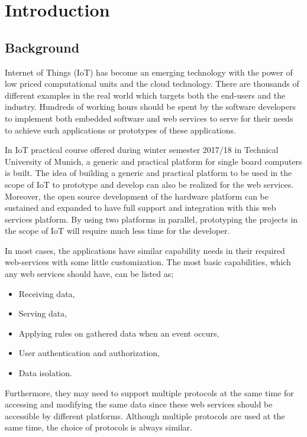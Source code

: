 
\chapter{Introduction}\label{chapter:introduction}

\section{Background}
Internet of Things (IoT) has become an emerging technology with the power of low priced computational units and the cloud technology. There are thousands of different examples in the real world which targets both the end-users and the industry. Hundreds of working hours should be spent by the software developers to implement both embedded software and web services to serve for their needs to achieve such applications or prototypes of these applications. 


In IoT practical course offered during winter semester 2017/18 in Technical University of Munich, a generic and practical platform for single board computers is built. The idea of building a generic and practical platform to be used in the scope of IoT to prototype and develop can also be realized for the web services. Moreover, the open source development of the hardware platform can be sustained and expanded to have full support and integration with this web services platform. By using two platforms in parallel, prototyping the projects in the scope of IoT will require much less time for the developer.

In most cases, the applications have similar capability needs in their required web-services with some little customization. The most basic capabilities, which any web services should have, can be listed as;
\begin{itemize}
  \item Receiving data,
  \item Serving data,
  \item Applying rules on gathered data when an event occurs,
  \item User authentication and authorization,
  \item Data isolation.
\end{itemize}
 Furthermore, they may need to support multiple protocols at the same time for accessing and modifying the same data since these web services should be accessible by different platforms. Although multiple protocols are used at the same time, the choice of protocols is always similar. 


